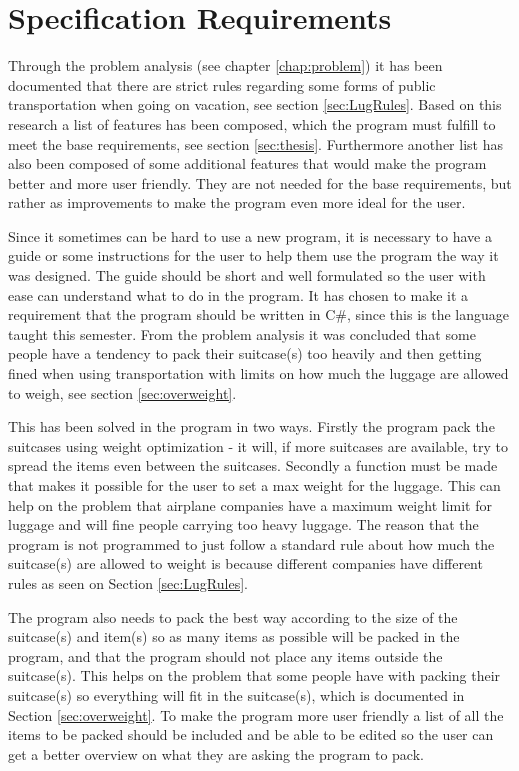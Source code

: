 \section{Specification Requirements}
\label{sec:Spec}
Through the problem analysis (see chapter \ref{chap:problem}) it has been documented that there are strict rules regarding some forms of public transportation when going on vacation, see section \ref{sec:LugRules}. Based on this research a list of features has been composed, which the program must fulfill to meet the base requirements, see section \ref{sec:thesis}. Furthermore another list has also been composed of some additional features that would make the program better and more user friendly. They are not needed for the base requirements, but rather as improvements to make the program even more ideal for the user.

Since it sometimes can be hard to use a new program, it is necessary to have a guide or some instructions for the user to help them use the program the way it was designed. The guide should be short and well formulated so the user with ease can understand what to do in the program.
It has chosen to make it a requirement that the program should be written in C\#, since this is the language taught this semester.
From the problem analysis it was concluded that some people have a tendency to pack their suitcase(s) too heavily and then getting fined when using transportation with limits on how much the luggage are allowed to weigh, see section \ref{sec:overweight}. 

This has been solved in the program in two ways. 
Firstly the program pack the suitcases using weight optimization - it will, if more suitcases are available, try to spread the items even between the suitcases. 
Secondly a function must be made that makes it possible for the user to set a max weight for the luggage. This can help on the problem that airplane companies have a maximum weight limit for luggage and will fine people carrying too heavy luggage. The reason that the program is not programmed to just follow a standard rule about how much the suitcase(s) are allowed to weight is because different companies have different rules as seen on Section \ref{sec:LugRules}.

The program also needs to pack the best way according to the size of the suitcase(s) and item(s) so as many items as possible will be packed in the program, and that the program should not place any items outside the suitcase(s). This helps on the problem that some people have with packing their suitcase(s) so everything will fit in the suitcase(s), which is documented in Section \ref{sec:overweight}.
To make the program more user friendly a list of all the items to be packed should be included and be able to be edited so the user can get a better overview on what they are asking the program to pack.


